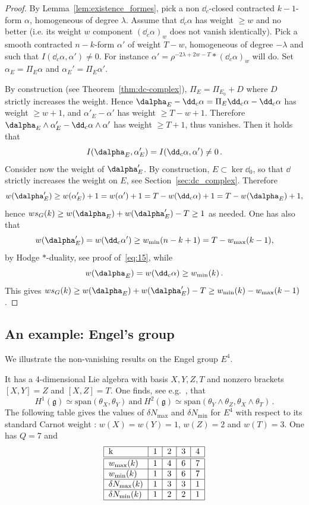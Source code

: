 \begin{proof}
By Lemma~\ref{lem:existence_formes}, pick a non $\dd_c$-closed contracted $k-1$-form $\alpha$, homogeneous of degree $\lambda$. Assume that $\dd_c\alpha$ has weight $\geq w$ and no better (i.e. its weight $w$ component $(\dd_c \alpha)_w$ does not vanish identically). Pick a smooth contracted $n-k$-form $\alpha'$ of weight $T-w$, homogeneous of degree $-\lambda$ and such that $I(\dd_c\alpha,\alpha')\not=0$. For instance $\alpha'= \rho^{-2\lambda+2w-T} * (\dd_c\alpha)_w$ will do. Set $\alpha_E = \Pi_E \alpha$ and $\alpha_E'= \Pi_E \alpha'$.

By construction (see Theorem~\ref{thm:dc-complex}), $\Pi_E = \Pi_{E_0}+ D$ where $D$ strictly increases the weight. Hence $\dalpha_E - \dd_c \alpha= \Pi_E \dd_c \alpha - \dd_c\alpha$ has weight $\geq w +1$, and $\alpha'_E - \alpha'$ has weight $\geq T-w + 1$. Therefore $\dalpha_E \wedge \alpha'_E - \dd_c \alpha \wedge \alpha'$ has weight $\geq T+1$, thus vanishes. Then it holds that
\[
I(\dalpha_E, \alpha'_E) = I(\dd_c \alpha, \alpha') \not=0 \,.
\]
Consider now the weight of $\dalpha'_E$. By construction, $E \subset \ker \dd_0$, so that $\dd$ strictly increases the weight on $E$, see Section~\ref{sec:dc_complex}. Therefore
\[
w(\dalpha'_E) \geq w(\alpha'_E) + 1 = w(\alpha')+ 1 = T - w(\dd_c
\alpha) + 1 = T -w(\dalpha_E) + 1,
\]
hence $ws_G(k) \geq w(\dalpha_E) + w (\dalpha'_E) - T \geq 1 $ as needed. One has also that
\[
w(\dalpha'_E) = w (\dd_c \alpha') \geq w_{\min}(n-k+1) = T - w_{\max}(k-1),
\]
by Hodge $*$-duality, see proof of~\eqref{eq:15}, while
\[
w(\dalpha_E) = w (\dd_c \alpha) \geq w_{\min}(k) \,.
\]
This gives $ws_G(k) \geq w(\dalpha_E) + w (\dalpha'_E) - T \geq w_{\min}(k) - w_{\max}(k-1)$.
\end{proof}


\subsection{An example: Engel's group}\label{sec:engels-group}

We illustrate the non-vanishing results on the Engel group $E^4$.

It has a 4-dimensional Lie algebra with basis $X,Y,Z,T$ and nonzero brackets $[X,Y]=Z$ and $[X,Z]=T$. One finds, see e.g.~\cite[Section~2.3]{Rumin_TSG}, that
\[
H^1(\mathfrak{g}) \simeq \mathrm{span}(\theta_X, \theta_Y) \
\mathrm{and} \ H^2(\mathfrak{g}) \simeq \mathrm{span}(\theta_Y \wedge
\theta_Z, \theta_X \wedge \theta_T) \,.
\]
The following table gives the values of $\delta N_{\max}$ and $\delta N_{\min}$ for $E^4$ with respect to its standard Carnot weight : $w(X)= w(Y) =1$, $w(Z)= 2$ and $w(T) = 3$. One has $Q=7$ and
\[
\begin{tabular}{|l|c|c|c|c|}
\hline k & 1 & 2 & 3 & 4 \\
\hline\hline $w_{\max}(k)$ & 1 & 4 & 6 & 7 \\
\hline $w_{\min}(k)$ & 1 & 3 & 6 & 7 \\
\hline $\delta N_{\max}(k)$ & 1 & 3 & 3 & 1 \\
\hline $\delta N_{\min}(k)$ & 1 & 2 & 2 & 1 \\
\hline
\end{tabular}
\]

